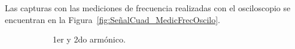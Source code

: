       Las capturas con las mediciones de frecuencia realizadas con el osciloscopio se encuentran en la 
      Figura~\ref{fig:SeñalCuad_MedicFrecOscilo}.

      \begin{figure}[H]
        \centering
        \begin{subfigure}[H]{0.40\textwidth}
          \caption{1er y 2do armónico.}
        \end{subfigure}
        \hfill 
        \begin{subfigure}[H]{0.40\textwidth}

\end{subfigure}
\end{figure}
